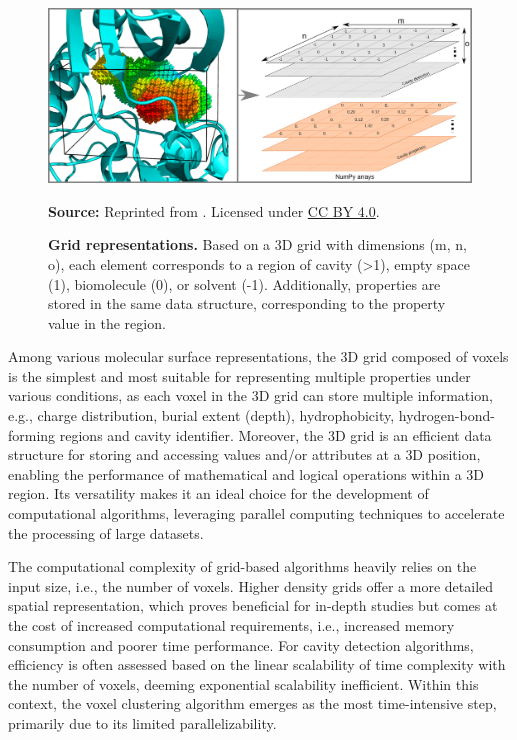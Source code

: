 \documentclass[Ingles]{phdthesis}
\def\ie{i.e.\onedot}
\def\eg{e.g.\onedot}
\begin{document}
\begin{figure}[h]
  \centerline{\includegraphics[scale=1]{images/voxels.png}}
  \centerline{\tiny{\textbf{Source:} Reprinted from \cite{guerra2021}. Licensed under \href{https://creativecommons.org/licenses/by/4.0/}{CC BY 4.0}.}}
  \caption[Grid representations]{\textbf{Grid representations.} Based on a 3D grid with dimensions (m, n, o), each element corresponds to a region of cavity (>1), empty space (1), biomolecule (0), or solvent (-1). Additionally, properties are stored in the same data structure, corresponding to the property value in the region.}
  \label{fig:voxel}
\end{figure}

Among various molecular surface representations, the \acs{3D} grid composed of voxels is the simplest and most suitable for representing multiple properties under various conditions, as each voxel in the \acs{3D} grid can store multiple information, \eg, charge distribution, burial extent (depth), hydrophobicity, hydrogen-bond-forming regions and cavity identifier. Moreover, the \acs{3D} grid is an efficient data structure for storing and accessing values and/or attributes at a \acs{3D} position, enabling the performance of mathematical and logical operations within a \acs{3D} region. Its versatility makes it an ideal choice for the development of computational algorithms, leveraging parallel computing techniques to accelerate the processing of large datasets.

The computational complexity of grid-based algorithms heavily relies on the input size, \ie, the number of voxels. Higher density grids offer a more detailed spatial representation, which proves beneficial for in-depth studies but comes at the cost of increased computational requirements, \ie, increased memory consumption and poorer time performance. For cavity detection algorithms, efficiency is often assessed based on the linear scalability of time complexity with the number of voxels, deeming exponential scalability inefficient. Within this context, the voxel clustering algorithm emerges as the most time-intensive step, primarily due to its limited parallelizability. 
\end{document}
